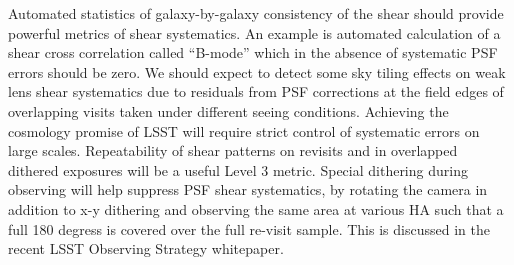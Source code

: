\documentclass[SE,toc,lsstdraft]{lsstdoc}
\newcommand{\newtext}[1]{{\color{blue} #1}}
\begin{document}
Automated statistics of galaxy-by-galaxy consistency of the shear should provide powerful metrics of shear systematics.  An example is automated calculation of a shear cross correlation called ``B-mode'' which in the absence of systematic PSF errors should be zero. We should expect to detect some sky tiling effects on weak lens shear systematics due to residuals from PSF corrections at the field edges of overlapping visits taken under different seeing conditions. Achieving the cosmology promise of LSST will require strict control of systematic errors on large scales. Repeatability of shear patterns on revisits and in overlapped dithered exposures will be a useful Level 3 metric.
\newtext{
Special dithering during observing will help suppress PSF shear systematics, by rotating the camera in addition to x-y dithering and observing the same area at various HA such that a full 180 degress is covered over the full re-visit sample. This is discussed in the recent LSST Observing Strategy whitepaper.  %
}


\end{document}
